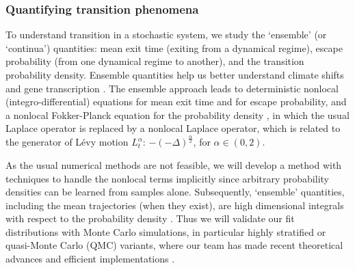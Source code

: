 \documentclass[11pt]{NSFamsart}
\begin{document}

\subsubsection*{Quantifying transition phenomena}
To understand transition in a stochastic system, we study the `ensemble' (or `continua') quantities: mean exit time (exiting from a dynamical regime), escape probability (from one dynamical regime to another), and  the transition  probability density. Ensemble quantities help us better understand  climate shifts \cite{ZhengYY2020} and  gene transcription \cite{ChenWuDuan}. 
The ensemble approach leads to deterministic  nonlocal (integro-differential) equations for mean exit time and for escape probability, and a nonlocal Fokker-Planck equation for the probability density \cite{DuanBook2015},
in which the usual Laplace operator is replaced
by a nonlocal Laplace operator, which is related to the generator of L\'evy motion $L_t^\alpha$:  $-(-\Delta)^{\frac{\alpha}2  }$, for $\alpha \in (0, 2)$.
 
 
As the usual numerical methods  are not feasible, we will develop a method with techniques to handle the nonlocal terms implicitly since arbitrary probability densities can be learned from samples alone. Subsequently, `ensemble' quantities, including the mean trajectories (when they exist), are high dimensional integrals with respect to the probability density \cite{DuanBook2015}.  Thus we will validate our fit distributions with Monte Carlo simulations, in particular highly stratified or quasi-Monte Carlo (QMC) variants, where our team has made recent theoretical advances \cite{Hic17a, HicEtal17a} and efficient implementations \cite{QMCPy2020a,ChoEtal22a}.
\end{document}
